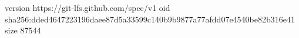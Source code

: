 version https://git-lfs.github.com/spec/v1
oid sha256:dded4647223196daee87d5a33599c140b9b9877a77afdd07e4540be82b316e41
size 87544
